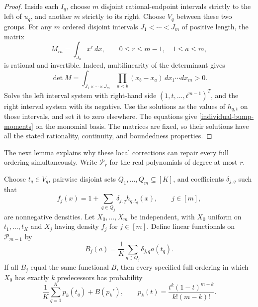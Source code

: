 \begin{proof}
Inside each \(I_q\), choose \(m\) disjoint rational-endpoint intervals
strictly to the left of \(u_q\), and another \(m\) strictly to its
right.  Choose \(V_q\) between these two groups.  For any \(m\)
ordered disjoint intervals \(J_1<\cdots<J_m\) of positive length,
the matrix
\[
  M_{ra}=\int_{J_a}x^r\,dx,
  \qquad 0\leq r\leq m-1,\quad 1\leq a\leq m,
\]
is rational and invertible.  Indeed, multilinearity of the determinant
gives
\[
  \det M=\int_{J_1\times\cdots\times J_m}
         \prod_{a<b}(x_b-x_a)\,dx_1\cdots dx_m>0.
\]
Solve the left interval system with right-hand side
\((1,t,\ldots,t^{m-1})^T\), and the right interval system with its
negative.  Use the solutions as the values of \(h_{q,t}\) on those
intervals, and set it to zero elsewhere.  The equations give
\eqref{individual-bump-moments} on the monomial basis.  The matrices
are fixed, so their solutions have all the stated rationality,
continuity, and boundedness properties.
\end{proof}

The next lemma explains why these local corrections can repair every
full ordering simultaneously.  Write \(\mathcal P_r\) for the real
polynomials of degree at most \(r\).

\begin{lemma}\label{individual-order-response}
Choose \(t_q\in V_q\), pairwise disjoint sets
\(Q_1,\ldots,Q_m\subseteq[K]\), and coefficients \(\delta_{j,q}\)
such that
\[
  f_j(x)=1+\sum_{q\in Q_j}\delta_{j,q}h_{q,t_q}(x),\qquad j\in[m],
\]
are nonnegative densities.  Let \(X_0,\ldots,X_m\) be independent,
with \(X_0\) uniform on \(t_1,\ldots,t_K\) and \(X_j\) having density
\(f_j\) for \(j\in[m]\).  Define linear functionals on
\(\mathcal P_{m-1}\) by
\[
  B_j(a)=\frac1K\sum_{q\in Q_j}\delta_{j,q}a(t_q).
\]
If all \(B_j\) equal the same functional \(B\), then every specified
full ordering in which \(X_0\) has exactly \(k\) predecessors has
probability
\begin{equation}\label{individual-response-formula}
  \frac1K\sum_{q=1}^K p_k(t_q)+B(p_k'),
  \qquad
  p_k(t)=\frac{t^k(1-t)^{m-k}}{k!(m-k)!}.
\end{equation}
\end{lemma}

